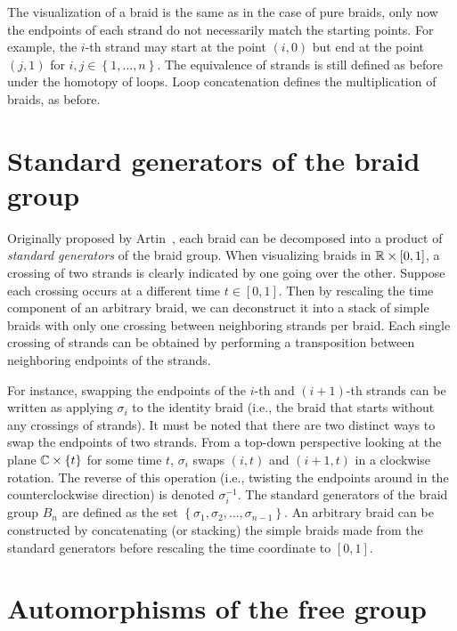 The visualization of a braid is the same as in the case of pure braids, only now the endpoints of each strand do not necessarily match the starting points. For example, the $i$-th strand may start at the point $(i,0)$ but end at the point $(j,1)$ for $i,j\in\left\{ 1,\dots,n \right\}$. The equivalence of strands is still defined as before under the homotopy of loops. Loop concatenation defines the multiplication of braids, as before.

\section{Standard generators of the braid group}\label{sec:std_gens}
Originally proposed by Artin~\cite{Artin1947}, each braid can be decomposed into a product of \textit{standard generators} of the braid group. When visualizing braids in $\mathbb{R}\times[0,1]$, a crossing of two strands is clearly indicated by one going over the other. Suppose each crossing occurs at a different time $t\in[0,1]$. Then by rescaling the time component of an arbitrary braid, we can deconstruct it into a stack of simple braids with only one crossing between neighboring strands per braid. Each single crossing of strands can be obtained by performing a transposition between neighboring endpoints of the strands.


For instance, swapping the endpoints of the $i$-th and $(i+1)$-th strands can be written as applying $\sigma_i$ to the identity braid (i.e., the braid that starts without any crossings of strands). It must be noted that there are two distinct ways to swap the endpoints of two strands. From a top-down perspective looking at the plane $\mathbb{C}\times\left\{ t \right\}$ for some time $t$, $\sigma_i$ swaps $(i,t)$ and $(i+1,t)$ in a clockwise rotation. The reverse of this operation (i.e., twisting the endpoints around in the counterclockwise direction) is denoted $\sigma_i^{-1}$. The standard generators of the braid group $B_n$ are defined as the set $\left\{ \sigma_1,\sigma_2,\dots,\sigma_{n-1} \right\}$. An arbitrary braid can be constructed by concatenating (or stacking) the simple braids made from the standard generators before rescaling the time coordinate to $[0,1]$.

\section{Automorphisms of the free group}\label{sec:Aut_Fn}

